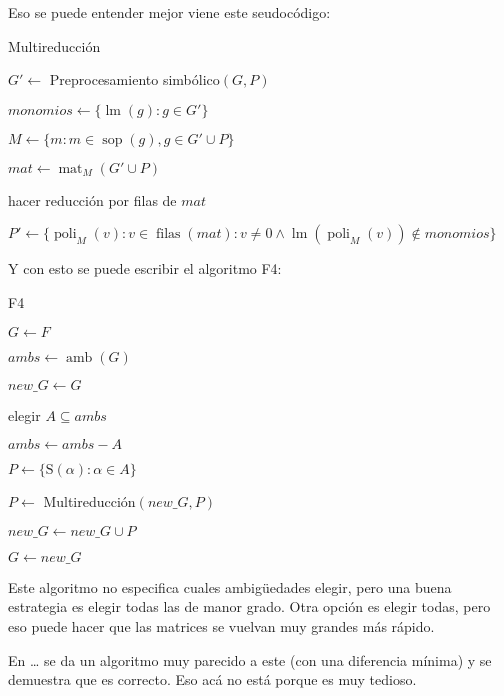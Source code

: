 \documentclass{report}
\theoremstyle{customstyle}
\theoremstyle{factstyle}
\DeclareMathOperator{\sop}{sop}
\DeclareMathOperator{\lm}{lm}
\DeclareMathOperator{\amb}{amb}
\renewcommand{\S}{\text{S}}
\DeclareMathOperator{\mat}{mat}
\DeclareMathOperator{\poli}{poli}
\DeclareMathOperator{\filas}{filas}
\begin{document}
Eso se puede entender mejor viene este seudocódigo:

\begin{algorithm}[H] %
  \caption{Multireducción}\label{alg:Multireducción}
  $G' ←$ Preprocesamiento simbólico$(G, P)$

  $monomios ← \{\lm(g) : g ∈ G'\}$

  $M ← \{m : m ∈ \sop(g), g ∈ G' ∪ P\}$

  $mat ← \mat_M(G' ∪ P)$

  hacer reducción por filas de $mat$

  $P' ← \{\poli_M(v) : v ∈ \filas(mat) : v ≠ 0 ∧ \lm(\poli_M(v)) ∉ monomios\}$

\end{algorithm}

Y con esto se puede escribir el algoritmo F4:

\begin{algorithm}[H] %
  \caption{F4}\label{alg:F4}
  $G ← F$

  \Loop{} {
    $ambs ← \amb(G)$

    $new\_G ← G$

     {
      elegir $Α ⊆ ambs$

      $ambs ← ambs - Α$

      $P ← \{\S(α) : α ∈ Α\}$

      $P ←$ Multireducción$(new\_G, P)$

      $new\_G ← new\_G ∪ P$
    }

     {
      \Break
    }

    $G ← new\_G$
  }

\end{algorithm}

Este algoritmo no especifica cuales ambigüedades elegir, pero una buena estrategia es elegir todas las de manor grado. Otra opción es elegir todas, pero eso puede hacer que las matrices se vuelvan muy grandes más rápido.

En … %
se da un algoritmo muy parecido a este (con una diferencia mínima) y se demuestra que es correcto. Eso acá no está porque es muy tedioso.
\end{document}
